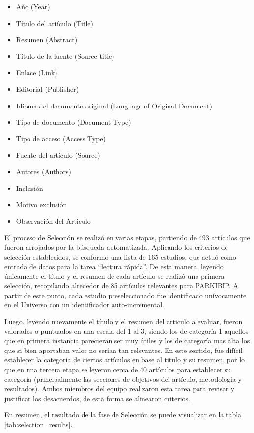 \begin{itemize}
    \item Año (Year)
    \item Título del artículo (Title)
    \item Resumen (Abstract)
    \item Título de la fuente (Source title)
    \item Enlace (Link)
    \item Editorial (Publisher)
    \item Idioma del documento original (Language of Original Document)
    \item Tipo de documento (Document Type)
    \item Tipo de acceso (Access Type)
    \item Fuente del artículo (Source)
    \item Autores (Authors)
    \item Inclusión
    \item Motivo exclusión
    \item Observación del Articulo
\end{itemize}

El proceso de Selección se realizó en varias etapas, partiendo de 493 artículos que fueron arrojados por la búsqueda automatizada. Aplicando los criterios de selección establecidos, se conformo una lista de 165 estudios, que actuó como entrada de datos para la tarea ``lectura rápida''.  De esta manera, leyendo únicamente el título y el resumen de cada artículo se realizó una primera selección, recopilando alrededor de 85 artículos relevantes para PARKIBIP. A partir de este punto, cada estudio preseleccionado fue identificado unívocamente en el Universo con un identificador auto-incremental.

Luego, leyendo nuevamente el título y el resumen del articulo a evaluar, fueron valorados o puntuados en una escala del 1 al 3, siendo los de categoría 1 aquellos que en primera instancia parecieran ser muy útiles y los de categoría mas alta los que si bien aportaban valor no serían tan relevantes. En este sentido, fue difícil establecer la categoría de ciertos artículos en base al titulo y su resumen, por lo que en una tercera etapa se leyeron cerca de 40 artículos para establecer su categoría (principalmente las secciones de objetivos del artículo, metodología y resultados). Ambos miembros del equipo realizaron esta tarea para revisar y justificar los desacuerdos, de esta forma se alinearon criterios. 

En resumen, el resultado de la fase de Selección se puede visualizar en la tabla \ref{tab:selection_results}.

